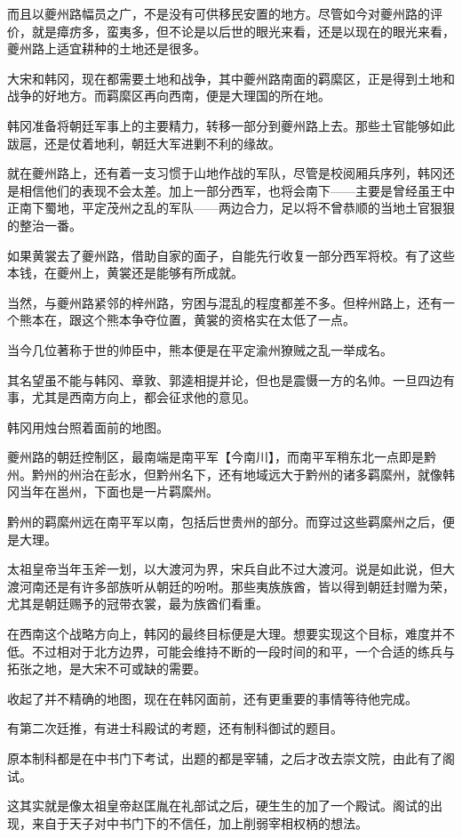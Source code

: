 而且以夔州路幅员之广，不是没有可供移民安置的地方。尽管如今对夔州路的评价，就是瘴疠多，蛮夷多，但不论是以后世的眼光来看，还是以现在的眼光来看，夔州路上适宜耕种的土地还是很多。

大宋和韩冈，现在都需要土地和战争，其中夔州路南面的羁縻区，正是得到土地和战争的好地方。而羁縻区再向西南，便是大理国的所在地。

韩冈准备将朝廷军事上的主要精力，转移一部分到夔州路上去。那些土官能够如此跋扈，还是仗着地利，朝廷大军进剿不利的缘故。

就在夔州路上，还有着一支习惯于山地作战的军队，尽管是校阅厢兵序列，韩冈还是相信他们的表现不会太差。加上一部分西军，也将会南下——主要是曾经虽王中正南下蜀地，平定茂州之乱的军队——两边合力，足以将不曾恭顺的当地土官狠狠的整治一番。

如果黄裳去了夔州路，借助自家的面子，自能先行收复一部分西军将校。有了这些本钱，在夔州上，黄裳还是能够有所成就。

当然，与夔州路紧邻的梓州路，穷困与混乱的程度都差不多。但梓州路上，还有一个熊本在，跟这个熊本争夺位置，黄裳的资格实在太低了一点。

当今几位著称于世的帅臣中，熊本便是在平定渝州獠贼之乱一举成名。

其名望虽不能与韩冈、章敦、郭逵相提并论，但也是震慑一方的名帅。一旦四边有事，尤其是西南方向上，都会征求他的意见。

韩冈用烛台照着面前的地图。

夔州路的朝廷控制区，最南端是南平军【今南川】，而南平军稍东北一点即是黔州。黔州的州治在彭水，但黔州名下，还有地域远大于黔州的诸多羁縻州，就像韩冈当年在邕州，下面也是一片羁縻州。

黔州的羁縻州远在南平军以南，包括后世贵州的部分。而穿过这些羁縻州之后，便是大理。

太祖皇帝当年玉斧一划，以大渡河为界，宋兵自此不过大渡河。说是如此说，但大渡河南还是有许多部族听从朝廷的吩咐。那些夷族族酋，皆以得到朝廷封赠为荣，尤其是朝廷赐予的冠带衣裳，最为族酋们看重。

在西南这个战略方向上，韩冈的最终目标便是大理。想要实现这个目标，难度并不低。不过相对于北方边界，可能会维持不断的一段时间的和平，一个合适的练兵与拓张之地，是大宋不可或缺的需要。

收起了并不精确的地图，现在在韩冈面前，还有更重要的事情等待他完成。

有第二次廷推，有进士科殿试的考题，还有制科御试的题目。

原本制科都是在中书门下考试，出题的都是宰辅，之后才改去崇文院，由此有了阁试。

这其实就是像太祖皇帝赵匡胤在礼部试之后，硬生生的加了一个殿试。阁试的出现，来自于天子对中书门下的不信任，加上削弱宰相权柄的想法。


